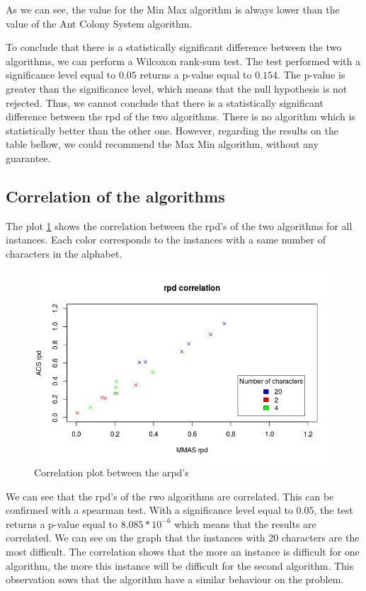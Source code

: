 \documentclass{article}
\begin{document}
As we can see, the value for the Min Max algorithm is always lower than the value of the Ant Colony System algorithm. \newline

To conclude that there is a statistically significant difference between the two algorithms, we can perform a Wilcoxon rank-sum test.
The test performed with a significance level equal to $0.05$ returns a p-value equal to $0.154$.
The p-value is greater than the significance level, which means that the null hypothesis is not rejected.
Thus, we cannot conclude that there is a statistically significant difference between the rpd of the two algorithms.
There is no algorithm which is statistically better than the other one.
However, regarding the results on the table bellow, we could recommend the Max Min algorithm, without any guarantee.

\subsection{Correlation of the algorithms}

The plot \ref{fig:corr} shows the correlation between the rpd's of the two algorithms for all instances.
Each color corresponds to the instances with a same number of characters in the alphabet. \newline

\begin{figure}
    \centering
        \includegraphics[scale=0.5]{correl}
    \caption{Correlation plot between the arpd's}
    \label{fig:corr}
\end{figure}

We can see that the rpd's of the rwo algorithms are correlated.
This can be confirmed with a spearman test.
With a significance level equal to $0.05$, the test returns a p-value equal to $8.085*10^{-6}$ which means that the results are correlated.
We can see on the graph that the instances with 20 characters are the most difficult.
The correlation shows that the more an instance is difficult for one algorithm, the more this instance will be difficult for the second algorithm.
This observation sows that the algorithm have a similar behaviour on the problem.
\end{document}
